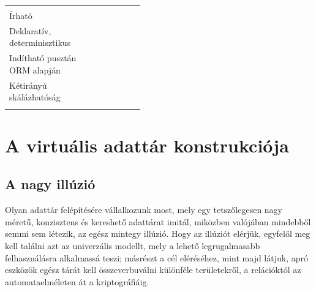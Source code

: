 \documentclass[
    parspace,
    noindent,
    nohyp,
]{elteiktdk}[2023/04/10]
\newcommand{\rhpad}{\vspace{0.6\baselineskip}}
\begin{document}
\begin{table}[H]
\begin{center}
\begin{tabular}{ |p{3.2cm}|c c c c c:c c| }
     &
     &
     &
     \\
  \comptablelinesep
  \parbox{\comptableleftwidth}{\rhpad Írható \rhpad} &
     &
     &
     &
     &
     &
     &
     \\
  \comptablelinesep
  \parbox{\comptableleftwidth}{\rhpad Deklaratív, \\ determinisztikus \rhpad} &
     &
     &
     &
     &
     &
     &
     \\
  \comptablelinesep
  \parbox{\comptableleftwidth}{\rhpad Indítható pusztán \\ ORM alapján \rhpad} &
     &
     &
     &
     &
     &
     &
     \\
  \comptablelinesep
  \parbox{\comptableleftwidth}{\rhpad Kétirányú \\ skálázhatóság \rhpad} &
     &
     &
     &
     &
     &
     &
     \\
  \hline
\end{tabular}
\end{center}
\end{table}


\chapter{A virtuális adattár konstrukciója}

\section{A nagy illúzió}

Olyan adattár felépítésére vállalkozunk most,
mely egy tetszőlegesen nagy méretű, konzisztens és kereshető adattárat imitál,
miközben valójában mindebből semmi sem létezik,
az egész mintegy illúzió.
Hogy az illúziót elérjük, egyfelől meg kell találni azt az univerzális modellt,
mely a lehető legrugalmasabb felhasználásra alkalmassá teszi;
másrészt a cél eléréséhez, mint majd látjuk, apró eszközök egész tárát kell összeverbuválni
különféle területekről, a relációktól az automataelméleten át a kriptográfiáig.
\end{document}
